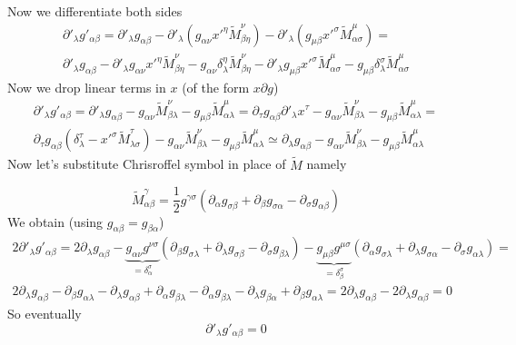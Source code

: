 %
Now we differentiate both sides
%
\begin{multline}
    \partial'_\lambda g'_{\alpha\beta} =
    \partial'_\lambda g_{\alpha\beta} -
    \partial'_\lambda (g_{\alpha\nu} x'^\eta \tilde{M}_{\beta\eta}^\nu) -
    \partial'_\lambda (g_{\mu\beta} x'^\sigma \tilde{M}_{\alpha\sigma}^\mu) = \\
    \partial'_\lambda g_{\alpha\beta} -
    \partial'_\lambda g_{\alpha\nu} x'^\eta \tilde{M}_{\beta\eta}^\nu -
    g_{\alpha\nu} \delta^\eta_\lambda \tilde{M}_{\beta\eta}^\nu -
    \partial'_\lambda g_{\mu\beta} x'^\sigma \tilde{M}_{\alpha\sigma}^\mu -
    g_{\mu\beta} \delta^\sigma_\lambda \tilde{M}_{\alpha\sigma}^\mu
\end{multline}
%
Now we drop linear terms in $x$ (of the form $x\partial g$)
%
\begin{multline}
    \partial'_\lambda g'_{\alpha\beta} =
    \partial'_\lambda g_{\alpha\beta} -
    g_{\alpha\nu} \tilde{M}_{\beta\lambda}^\nu -
    g_{\mu\beta} \tilde{M}_{\alpha\lambda}^\mu=
    \partial_\tau g_{\alpha\beta} \partial'_\lambda x^\tau -
    g_{\alpha\nu} \tilde{M}_{\beta\lambda}^\nu -
    g_{\mu\beta} \tilde{M}_{\alpha\lambda}^\mu=\\
    \partial_\tau g_{\alpha\beta}
    \left(\delta^\tau_\lambda -
    x'^\sigma \tilde{M}_{\lambda\sigma}^\tau\right) -
    g_{\alpha\nu} \tilde{M}_{\beta\lambda}^\nu -
    g_{\mu\beta} \tilde{M}_{\alpha\lambda}^\mu \simeq
    \partial_\lambda g_{\alpha\beta} -
    g_{\alpha\nu} \tilde{M}_{\beta\lambda}^\nu -
    g_{\mu\beta} \tilde{M}_{\alpha\lambda}^\mu
\end{multline}
%
Now let's substitute Chrisroffel symbol in place of $\tilde{M}$ namely

\begin{equation}
    \tilde{M}_{\alpha\beta}^\gamma =
    \frac{1}{2}
    g^{\gamma\sigma}(\partial_\alpha g_{\sigma\beta}+
    \partial_\beta g_{\sigma\alpha}-
    \partial_\sigma g_{\alpha\beta})
\end{equation}
%
We obtain (using $g_{\alpha\beta} = g_{\beta\alpha}$)
%
\begin{multline}
    2\partial'_\lambda g'_{\alpha\beta} =
    2\partial_\lambda g_{\alpha\beta} -
    \underbrace{g_{\alpha\nu}g^{\nu\sigma}}_{=\delta_\alpha^\sigma}
    (\partial_\beta g_{\sigma\lambda}+
    \partial_\lambda g_{\sigma\beta}-
    \partial_\sigma g_{\beta\lambda})-
    \underbrace{g_{\mu\beta}g^{\mu\sigma}}_{=\delta_\beta^\sigma}
    (\partial_\alpha g_{\sigma\lambda}+
    \partial_\lambda g_{\sigma\alpha}-
    \partial_\sigma g_{\alpha\lambda}) = \\
    2\partial_\lambda g_{\alpha\beta} -
    \partial_\beta g_{\alpha\lambda}-
    \partial_\lambda g_{\alpha\beta}+
    \partial_\alpha g_{\beta\lambda}-
    \partial_\alpha g_{\beta\lambda}-
    \partial_\lambda g_{\beta\alpha}+
    \partial_\beta g_{\alpha\lambda}=
    2\partial_\lambda g_{\alpha\beta} -
    2\partial_\lambda g_{\alpha\beta} = 0
\end{multline}
%
So eventually
%
\begin{equation}
    \boxed{\partial'_\lambda g'_{\alpha\beta}=0}
\end{equation}

